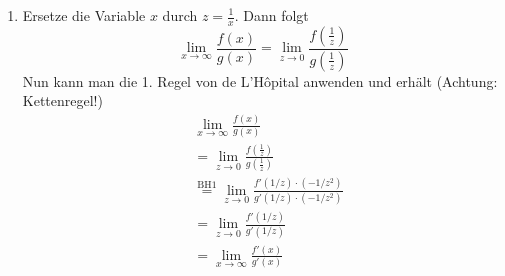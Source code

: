 \begin{enumerate}
	\item Ersetze die Variable \( x \) durch \( z = \frac{1}{x} \). Dann folgt
	      \[
		      \lim_{{x \to \infty}} \frac{f(x)}{g(x)} = \lim_{{z \to 0}} \frac{f\left(\frac{1}{z}\right)}{g\left(\frac{1}{z}\right)}
	      \]
	      Nun kann man die 1. Regel von de L'Hôpital anwenden und erhält (Achtung: Kettenregel!)
	      \[
		      \begin{aligned}
			       & \lim_{{x \to \infty}} \frac{f(x)}{g(x)}                                                         \\
			       & = \lim_{{z \to 0}} \frac{f\left(\frac{1}{z}\right)}{g\left(\frac{1}{z}\right)}                  \\
			       & \stackrel{\text{BH1}}{=} \lim_{{z \to 0}} \frac{f'(1/z) \cdot (-1/z^2)}{g'(1/z) \cdot (-1/z^2)} \\
			       & = \lim_{{z \to 0}} \frac{f'(1/z)}{g'(1/z)}                                                      \\
			       & = \lim_{{x \to \infty}} \frac{f'(x)}{g'(x)}
		      \end{aligned}
	      \]

\end{enumerate}

